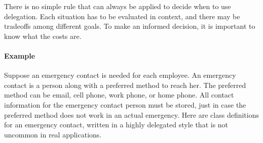 There is no simple rule that can always be applied to decide when to use delegation. Each situation has to be evaluated
in context, and there may be tradeoffs among different goals. To make an informed decision, it is important to know what
the costs are.

\paragraph{Example} Suppose an emergency contact is needed for each employee.
An emergency contact is a person along with a preferred method to reach her.  The preferred method can be email, cell phone, work phone, or home phone. All contact information for
the emergency contact person must be stored, just in case the preferred method does not work in an actual emergency. 
Here are class definitions for an emergency contact, written in a highly delegated style that is not uncommon in real applications. 

